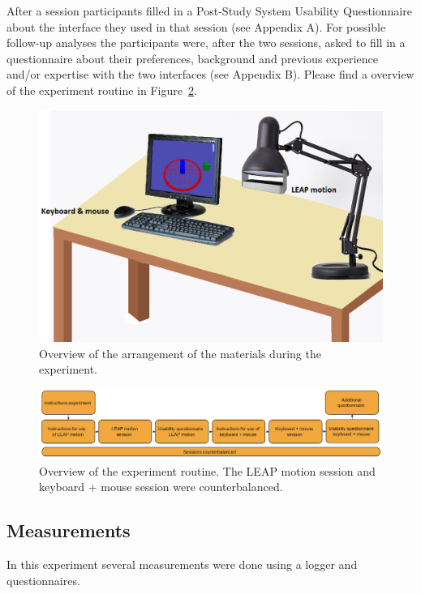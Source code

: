 After a session participants filled in a Post-Study System Usability Questionnaire about the interface they used in that session (see Appendix A). 
For possible follow-up analyses the participants were, after the two sessions, asked to fill in a questionnaire about their preferences, background and previous experience and/or expertise with the two interfaces (see Appendix B). Please find a overview of the experiment routine in Figure~\ref{fig:experimentroutine}.
\begin{figure}
\includegraphics[width=\textwidth]{imgs/configuration}
\caption{Overview of the arrangement of the materials during the experiment.}
\label{fig:configuration}
\end{figure}

\begin{figure}
\includegraphics[width=\textwidth]{imgs/experimentroutine}
\caption{Overview of the experiment routine. The LEAP motion session and keyboard + mouse session were counterbalanced.}
\label{fig:experimentroutine}
\end{figure}


\subsection{Measurements}
In this experiment several measurements were done using a logger and questionnaires. 

